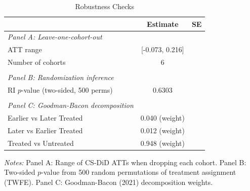\begin{table}[htbp]
\centering
\caption{Robustness Checks}
\label{tab:robust}
\begin{threeparttable}
\begin{tabular}{lcc}
\toprule
 & Estimate & SE \\
\midrule
\textit{Panel A: Leave-one-cohort-out} & & \\
ATT range & [-0.073, 0.216] & \\
Number of cohorts & 6 & \\
 & & \\
\textit{Panel B: Randomization inference} & & \\
RI $p$-value (two-sided, 500 perms) & 0.6303 & \\
 & & \\
\textit{Panel C: Goodman-Bacon decomposition} & & \\
\quad Earlier vs Later Treated & 0.040 (weight) & \\
\quad Later vs Earlier Treated & 0.012 (weight) & \\
\quad Treated vs Untreated & 0.948 (weight) & \\
\bottomrule
\end{tabular}
\begin{tablenotes}[flushleft]\small
\item \textit{Notes:} Panel A: Range of CS-DiD ATTs when dropping each cohort. Panel B: Two-sided $p$-value from 500 random permutations of treatment assignment (TWFE). Panel C: Goodman-Bacon (2021) decomposition weights.
\end{tablenotes}
\end{threeparttable}
\end{table}
